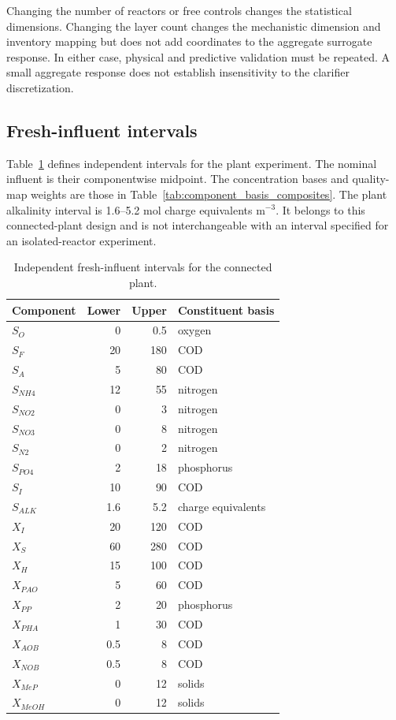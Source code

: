 Changing the number of reactors or free controls changes the statistical dimensions. Changing the layer count changes the mechanistic dimension and inventory mapping but does not add coordinates to the aggregate surrogate response. In either case, physical and predictive validation must be repeated. A small aggregate response does not establish insensitivity to the clarifier discretization.

\subsection{Fresh-influent intervals}

Table~\ref{tab:plant_influent_intervals} defines independent intervals for the plant experiment. The nominal influent is their componentwise midpoint. The concentration bases and quality-map weights are those in Table~\ref{tab:component_basis_composites}. The plant alkalinity interval is 1.6--5.2 mol charge equivalents m$^{-3}$. It belongs to this connected-plant design and is not interchangeable with an interval specified for an isolated-reactor experiment.

\begin{table}[htbp]
\centering\small
\caption{Independent fresh-influent intervals for the connected plant.}\label{tab:plant_influent_intervals}
\begin{tabular}{lrrl}
\toprule
Component & Lower & Upper & Constituent basis\\
\midrule
$S_O$ & 0 & 0.5 & oxygen\\
$S_F$ & 20 & 180 & COD\\
$S_A$ & 5 & 80 & COD\\
$S_{NH4}$ & 12 & 55 & nitrogen\\
$S_{NO2}$ & 0 & 3 & nitrogen\\
$S_{NO3}$ & 0 & 8 & nitrogen\\
$S_{N2}$ & 0 & 2 & nitrogen\\
$S_{PO4}$ & 2 & 18 & phosphorus\\
$S_I$ & 10 & 90 & COD\\
$S_{ALK}$ & 1.6 & 5.2 & charge equivalents\\
$X_I$ & 20 & 120 & COD\\
$X_S$ & 60 & 280 & COD\\
$X_H$ & 15 & 100 & COD\\
$X_{PAO}$ & 5 & 60 & COD\\
$X_{PP}$ & 2 & 20 & phosphorus\\
$X_{PHA}$ & 1 & 30 & COD\\
$X_{AOB}$ & 0.5 & 8 & COD\\
$X_{NOB}$ & 0.5 & 8 & COD\\
$X_{MeP}$ & 0 & 12 & solids\\
$X_{MeOH}$ & 0 & 12 & solids\\
\bottomrule
\end{tabular}
\end{table}

